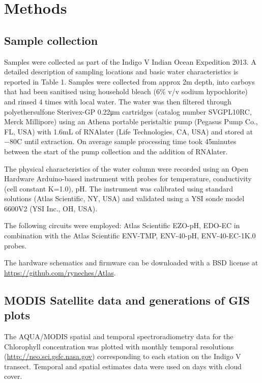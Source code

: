 \section{Methods}

\subsection{Sample collection}

Samples were collected as part of the Indigo V Indian Ocean Expedition 2013.\cite{lauro_common_2014} A detailed description of sampling locations and basic water characteristics is reported in Table 1. Samples were collected from approx 2m depth, into carboys that had been sanitised using household bleach (6\% v/v sodium hypochlorite) and rinsed 4 times with local water. The water was then filtered through polyethersulfone Sterivex-GP 0.22\si{\micro\meter} cartridges (catalog number SVGPL10RC, Merck Millipore) using an Athena portable peristaltic pump (Pegasus Pump Co., FL, USA) with 1.6mL of RNAlater (Life Technologies, CA, USA) and stored at −80\degree C until extraction. On average sample processing time took 45minutes between the start of the pump collection and the addition of RNAlater.

The physical characteristics of the water column were recorded using an Open Hardware Arduino-based instrument with probes for temperature, conductivity (cell constant K=1.0), pH. The instrument was calibrated using standard solutions (Atlas Scientific, NY, USA) and validated using a YSI sonde model 6600V2 (YSI Inc., OH, USA).

The following circuits were employed: Atlas Scientific EZO-pH, EDO-EC in combination with the Atlas Scientific ENV-TMP, ENV-40-pH, ENV-40-EC-1K.0 probes.

The hardware schematics and firmware can be downloaded with a BSD license at \url{https://github.com/ryneches/Atlas}.

\subsection{MODIS Satellite data and generations of GIS plots}

The AQUA/MODIS \cite{mcclain_decade_2009} spatial and temporal spectroradiometry data for the Chlorophyll concentration was plotted with monthly temporal resolutions (\url{http://neo.sci.gsfc.nasa.gov}) corresponding to each station on the Indigo V transect. Temporal and spatial estimates data were used on days with cloud cover.

